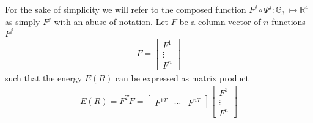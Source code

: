 \documentclass{birkjour}
\numberwithin{equation}{section}
\begin{document}
For the sake of simplicity we will refer to the composed function $F^j \circ \Psi^j:\mathbb{G}^{+}_3 \mapsto \mathbb{R}^4$ as simply $F^j$ with an abuse of notation.
Let $F$ be a column vector of $n$ functions $F^j$
\begin{eqnarray*}
F = \left[\begin{array}{c}F^1 \\ \vdots \\ F^n\end{array}\right]
\end{eqnarray*}
 such that the energy $E(R)$ can be expressed as matrix product
\begin{eqnarray*}
E(R) = F^T F =
\left[\begin{array}{ccc}F^{1T} & \cdots & F^{nT}\end{array}\right]
\left[\begin{array}{c}F^1 \\ \vdots \\ F^n\end{array}\right]
\end{eqnarray*}
\end{document}
